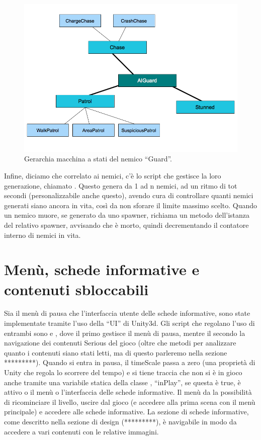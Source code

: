 \begin{figure}[h]
\centerline{\includegraphics[scale=0.45]{images/development/gerarchiaAIGuard.png}}
\caption{Gerarchia macchina a stati del nemico ``Guard''.}
\label{fig:gerarchiaAIGuard}
\end{figure}

Infine, diciamo che correlato ai nemici, c'è lo script che gestisce la loro generazione, chiamato . Questo genera da 1 ad n nemici, ad un ritmo di tot secondi (personalizzabile anche questo), avendo cura di controllare quanti nemici generati siano ancora in vita, così da non sforare il limite massimo scelto. Quando un nemico muore, se generato da uno spawner, richiama un metodo dell'istanza del relativo spawner, avvisando che è morto, quindi decrementando il contatore interno di nemici in vita.

\newpage

\section{Menù, schede informative e contenuti sbloccabili}

Sia il menù di pausa che l'interfaccia utente delle schede informative, sono state implementate tramite l'uso della ``UI'' di Unity3d. Gli script che regolano l'uso di entrambi sono  e , dove il primo gestisce il menù di pausa, mentre il secondo la navigazione dei contenuti Serious del gioco (oltre che metodi per analizzare quanto i contenuti siano stati letti, ma di questo parleremo nella sezione *********). Quando si entra in pausa, il timeScale passa a zero (una proprietà di Unity che regola lo scorrere del tempo) e si tiene traccia che non si è in gioco anche tramite una variabile statica della classe , ``inPlay'', se questa è true, è attivo o il menù o l'interfaccia delle schede informative.
Il menù da la possibilità di ricominciare il livello, uscire dal gioco (e accedere alla prima scena con il menù principale) e accedere alle schede informative. La sezione di schede informative, come descritto nella sezione di design (*********), è navigabile in modo da accedere a vari contenuti con le relative immagini.

